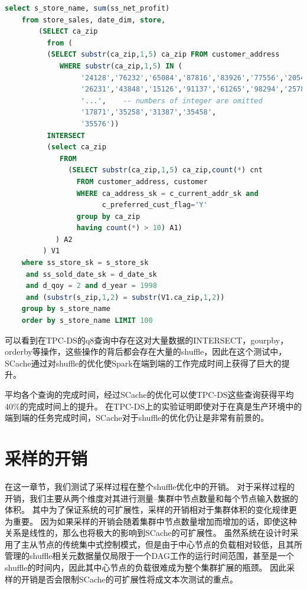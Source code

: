 \begin{lstlisting}[language={SQL}, caption={TCP-DS的q8查询代码片段}, label={code:tpcq8}]
    select s_store_name, sum(ss_net_profit)
    from store_sales, date_dim, store,
        (SELECT ca_zip
          from (
          (SELECT substr(ca_zip,1,5) ca_zip FROM customer_address
             WHERE substr(ca_zip,1,5) IN (
                  '24128','76232','65084','87816','83926','77556','20548',
                  '26231','43848','15126','91137','61265','98294','25782',
                  '...',    -- numbers of integer are omitted
                  '17871','35258','31387','35458',
                  '35576'))
          INTERSECT
          (select ca_zip
             FROM
               (SELECT substr(ca_zip,1,5) ca_zip,count(*) cnt
                 FROM customer_address, customer
                 WHERE ca_address_sk = c_current_addr_sk and
                       c_preferred_cust_flag='Y'
                 group by ca_zip
                 having count(*) > 10) A1)
            ) A2
         ) V1
    where ss_store_sk = s_store_sk
     and ss_sold_date_sk = d_date_sk
     and d_qoy = 2 and d_year = 1998
     and (substr(s_zip,1,2) = substr(V1.ca_zip,1,2))
    group by s_store_name
    order by s_store_name LIMIT 100
\end{lstlisting}

可以看到在TPC-DS的q8查询中存在这对大量数据的INTERSECT，gourpby，orderby等操作，这些操作的背后都会存在大量的shuffle，因此在这个测试中，SCache通过对shuffle的优化使Spark在端到端的工作完成时间上获得了巨大的提升。

平均各个查询的完成时间，经过SCache的优化可以使TPC-DS这些查询获得平均40\%的完成时间上的提升。
在TPC-DS上的实验证明即使对于在真是生产环境中的端到端的任务完成时间，SCache对于shuffle的优化仍让是非常有前景的。

\section{采样的开销}

在这一章节，我们测试了采样过程在整个shuffle优化中的开销。
对于采样过程的开销，我们主要从两个维度对其进行测量--集群中节点数量和每个节点输入数据的体积。
其中为了保证系统的可扩展性，采样的开销相对于集群体积的变化规律更为重要。
因为如果采样的开销会随着集群中节点数量增加而增加的话，即使这种关系是线性的，那么也将极大的影响到SCache的可扩展性。
虽然系统在设计时采用了主从节点的传统集中式控制模式，但是由于中心节点的负载相对较低，且其所管理的shuffle相关元数据量仅局限于一个DAG工作的运行时间范围，甚至是一个shuffle的时间内，因此其中心节点的负载很难成为整个集群扩展的瓶颈。
因此采样的开销是否会限制SCache的可扩展性将成文本次测试的重点。

